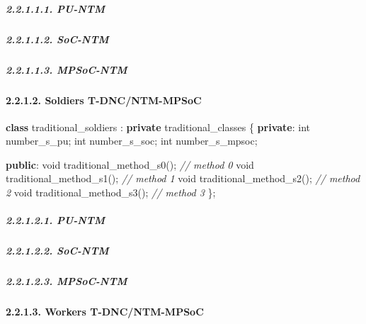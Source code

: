 \documentclass[
]{article}
\newenvironment{Shaded}{}{}
\newcommand{\CommentTok}[1]{\textcolor[rgb]{0.38,0.63,0.69}{\textit{#1}}}
\newcommand{\DataTypeTok}[1]{\textcolor[rgb]{0.56,0.13,0.00}{#1}}
\newcommand{\KeywordTok}[1]{\textcolor[rgb]{0.00,0.44,0.13}{\textbf{#1}}}
\newcommand{\NormalTok}[1]{#1}
\begin{document}
\hypertarget{pu-ntm-3}{%
\subparagraph{2.2.1.1.1. PU-NTM}\label{pu-ntm-3}}

\hypertarget{soc-ntm-3}{%
\subparagraph{2.2.1.1.2. SoC-NTM}\label{soc-ntm-3}}

\hypertarget{mpsoc-ntm-3}{%
\subparagraph{2.2.1.1.3. MPSoC-NTM}\label{mpsoc-ntm-3}}

\hypertarget{soldiers-t-dncntm-mpsoc-1}{%
\paragraph{2.2.1.2. Soldiers
T-DNC/NTM-MPSoC}\label{soldiers-t-dncntm-mpsoc-1}}

\begin{Shaded}
\begin{Highlighting}[]
\KeywordTok{class}\NormalTok{ traditional\_soldiers : }\KeywordTok{private}\NormalTok{ traditional\_classes \{}
   \KeywordTok{private}\NormalTok{:}
      \DataTypeTok{int}\NormalTok{ number\_s\_pu;}
      \DataTypeTok{int}\NormalTok{ number\_s\_soc;}
      \DataTypeTok{int}\NormalTok{ number\_s\_mpsoc;}

   \KeywordTok{public}\NormalTok{:}
      \DataTypeTok{void}\NormalTok{ traditional\_method\_s0();  }\CommentTok{// method 0}
      \DataTypeTok{void}\NormalTok{ traditional\_method\_s1();  }\CommentTok{// method 1}
      \DataTypeTok{void}\NormalTok{ traditional\_method\_s2();  }\CommentTok{// method 2}
      \DataTypeTok{void}\NormalTok{ traditional\_method\_s3();  }\CommentTok{// method 3}
\NormalTok{\};}
\end{Highlighting}
\end{Shaded}

\hypertarget{pu-ntm-4}{%
\subparagraph{2.2.1.2.1. PU-NTM}\label{pu-ntm-4}}

\hypertarget{soc-ntm-4}{%
\subparagraph{2.2.1.2.2. SoC-NTM}\label{soc-ntm-4}}

\hypertarget{mpsoc-ntm-4}{%
\subparagraph{2.2.1.2.3. MPSoC-NTM}\label{mpsoc-ntm-4}}

\hypertarget{workers-t-dncntm-mpsoc-1}{%
\paragraph{2.2.1.3. Workers
T-DNC/NTM-MPSoC}\label{workers-t-dncntm-mpsoc-1}}
\end{document}
